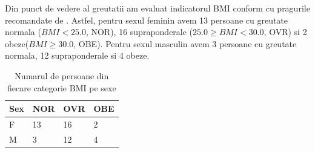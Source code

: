 \documentclass[11pt,draft]{article}
\begin{document}
  Din punct de vedere al greutatii am evaluat indicatorul \ac{BMI} conform cu pragurile recomandate de \citep{whobmi06}. Astfel, pentru sexul feminin avem 13 persoane cu greutate normala ($BMI<25.0$, NOR), 16 supraponderale ($25.0 \geq BMI <30.0$, OVR) si 2 obeze($BMI \geq 30.0$, OBE). Pentru sexul masculin avem 3 persoane cu greutate normala, 12 supraponderale si 4 obeze.   
  \begin{table}[H]
  \centering
  \begin{tabular}{ |l|l|l|l| }
  \hline
  Sex & NOR & OVR & OBE \\ \hline
  F & 13 & 16 & 2 \\ \hline
  M & 3 &  12 & 4 \\ \hline
  \end{tabular}
  \caption{Numarul de persoane din fiecare categorie BMI pe sexe}
  \label{tab:BMIgSex}
\end{table}
\end{document}
